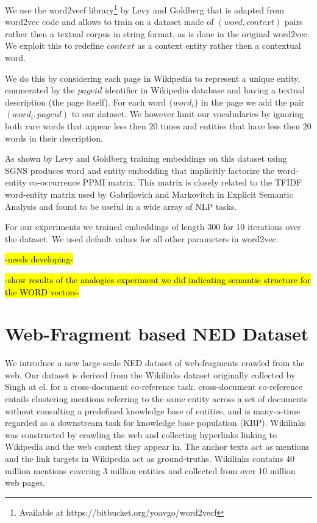\documentclass[11pt]{article}
\begin{document}
	We use the word2vecf library\footnote{Available at https://bitbucket.org/yoavgo/word2vecf} by Levy and Goldberg \cite{levy2014dependency} that is adapted from word2vec code and allows to train on a dataset made of $(word,context)$ pairs rather then a textual corpus in string format, as is done in the original word2vec. We exploit this to redefine $context$ as a context entity rather then a contextual word. 
	
	We do this by considering each page in Wikipedia to represent a unique entity, enumerated by the $pageid$ identifier in Wikipedia database and having a textual description (the page itself). For each word $\{word_i\}$ in the page we add the pair $(word_i,pageid)$ to our dataset. We however limit our vocabularies by ignoring both rare words that appear less then $20$ times and entities that have less then $20$ words in their description.
		
	As shown by Levy and Goldberg \cite{levy2014neural} training embeddings on this dataset using SGNS produces word and entity embedding that implicitly factorize the word-entity co-occurrence PPMI matrix. This matrix is closely related to the TFIDF word-entity matrix used by Gabrilovich and Markovitch \cite{gabrilovich2007computing} in Explicit Semantic Analysis and found to be useful in a wide array of NLP tasks. 
	
	For our experiments we trained embeddings of length 300 for 10 iterations over the dataset. We used default values for all other parameters in word2vec.
	
	\hl{-needs developing-}
	
	\hl{-show results of the analogies experiment we did indicating semantic structure for the WORD vectors-}
	
	\section{Web-Fragment based NED Dataset}
	We introduce a new large-scale NED dataset of web-fragments crawled from the web. Our dataset is derived from the Wikilinks dataset originally collected by Singh at el. \cite{singh12:wiki-links} for a cross-document co-reference task. cross-document co-reference entails clustering mentions referring to the same entity across a set of documents without consulting a predefined knowledge base of entities, and is many-a-time regarded as a downstream task for knowledge base population (KBP). Wikilinks was constructed by crawling the web and collecting hyperlinks linking to Wikipedia and the web context they appear in. The anchor texts act as mentions and the link targets in Wikipedia act as ground-truths. Wikilinks contains 40 million mentions covering 3 million entities and collected from over 10 million web pages.
	
\end{document}
